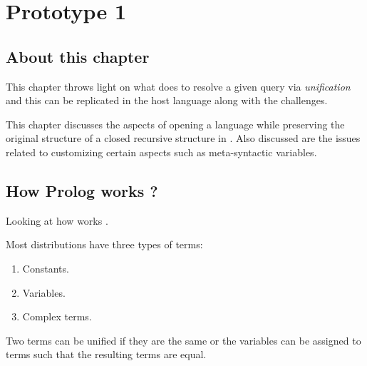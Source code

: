 \documentclass[thesis-solanki.tex]{subfiles}
\begin{document}
\chapter{Prototype 1}{\label{proto1}}

\section{About this chapter}
This chapter throws light on what  does to resolve a given query via \textit{unification} and this can be replicated in
the host language along with the challenges.  

This chapter discusses the aspects of opening a language while preserving the original structure of a closed recursive structure in 
. Also discussed are the issues related to customizing certain aspects such as meta-syntactic variables.

\section{How Prolog works ?}
Looking at how  works \cite{webiste:learnprolognow}.

Most  distributions have three types of terms:
\begin{enumerate}
\item Constants.

\item Variables.

\item Complex terms.
\end{enumerate}

Two terms can be unified if they are the same or the variables can be assigned to terms such that the resulting terms are equal.
\end{document}
